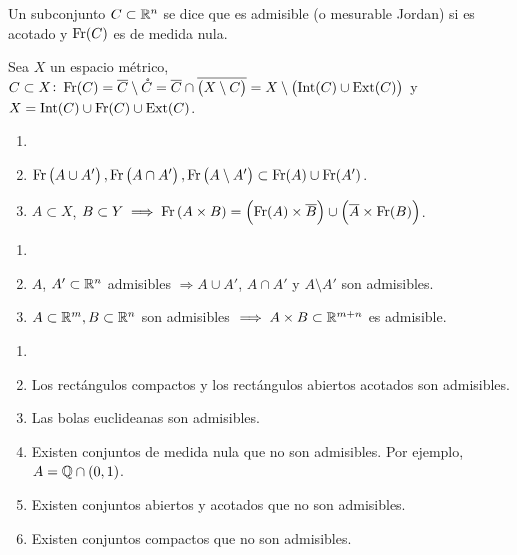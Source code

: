  \begin{defi}
    Un subconjunto $C \subset \mathbb{R}^n$ se dice que es admisible (o mesurable Jordan) si es acotado y $\operatorname{Fr}(C)$ es de medida nula.
 \end{defi}
 \begin{obs}
    Sea $X$ un espacio métrico, $C \subset X \colon \operatorname{Fr}(C) = \overline{C} \setminus \mathring{C} = \overline{C} \cap \overline{\left( X \setminus C \right)} = X \setminus \left( \operatorname{Int}(C) \cup \operatorname{Ext}(C) \right)$ y $X = \operatorname{Int}(C) \cup \operatorname{Fr}(C) \cup \operatorname{Ext}(C)$.
 \end{obs}
 \begin{lema}
    \begin{enumerate}[(1)]
        \item[]
        \item $\operatorname{Fr} \left( A\cup A' \right), \operatorname{Fr} \left( A\cap A' \right), \operatorname{Fr} \left( A\setminus A' \right) \subset \operatorname{Fr}(A)\cup\operatorname{Fr}(A')$.
        \item $A \subset X$, $B \subset Y \implies \operatorname{Fr} \left( A \times B\right) = \left( \operatorname{Fr}(A)\times \overline{B} \right) \cup \left( \overline{A} \times \operatorname{Fr}(B) \right)$.
    \end{enumerate}
\end{lema}
\begin{col}
    \begin{enumerate}[(1)]
        \item[]
        \item $A$, $A' \subset \mathbb{R}^n$ admisibles $\Longrightarrow A\cup A'$, $A\cap A'$ y $A\setminus A'$ son admisibles.
        \item $A \subset \mathbb{R}^m, B \subset \mathbb{R}^n$ son admisibles $\implies A\times B \subset \mathbb{R}^{m+n}$ es admisible.
    \end{enumerate}
\end{col}

\begin{example}
    \begin{enumerate}[(1)] \item[]
        \item Los rectángulos compactos y los rectángulos abiertos acotados son admisibles.
        \item Las bolas euclideanas son admisibles.
        \item Existen conjuntos de medida nula que no son admisibles. Por ejemplo, $A=\mathbb{Q} \cap \left( 0, 1 \right)$.
        \item Existen conjuntos abiertos y acotados que no son admisibles.
        \item Existen conjuntos compactos que no son admisibles.
    \end{enumerate}
\end{example}

